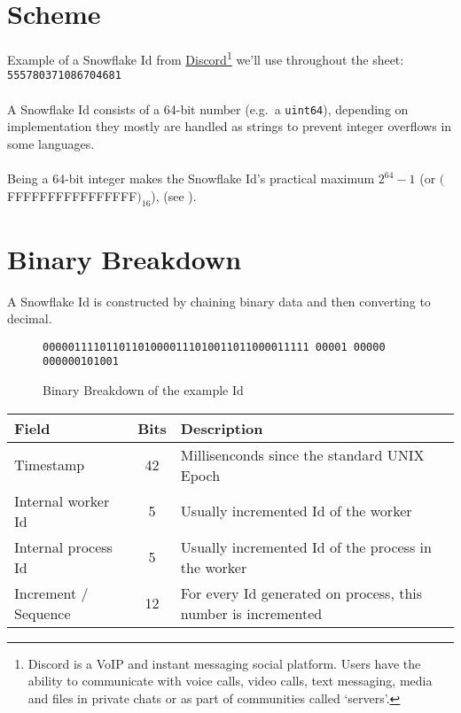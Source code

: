 \documentclass{article}
\newcommand{\code}[1]{\colorbox{cverbbg}{\texttt{#1}}}
\newcommand{\hn}[0]{\hfill \\}
\begin{document}
\section{Scheme}
Example of a Snowflake Id from
\href{https://discord.com/}{Discord}\footnote{Discord is a VoIP and instant
	messaging social platform. Users have the ability to communicate with
	voice
	calls, video calls, text messaging, media and files in private chats or
	as
	part
	of communities called `servers'.} we'll use throughout the sheet:
\code{555780371086704681} \\
\hn{}
A Snowflake Id consists of a 64-bit number (e.g.\ a \code{uint64}), depending
on
implementation they mostly are handled as strings to prevent integer overflows
in some languages. \\
\hn{}
Being a 64-bit integer makes the Snowflake Id's practical maximum
$2^{64} - 1$ (or $($FFFFFFFFFFFFFFFF$)_{16}$),
(see ).

\section{Binary Breakdown}
A Snowflake Id is constructed by chaining binary data and then converting to
decimal. \\

\begin{figure}[H]
	\large{\texttt{\color{cyan}000001111011011010000111010011011000011111
			\color{red}00001 \color{green}00000
			\color{gray}000000101001}}
	\\
	\caption{Binary Breakdown of the example
		Id}\label{fig:breakdown_example}
\end{figure}

\begin{table}[h]
	\begin{tabular}{l|c|l}
		Field                & Bits           & Description
		\\ \hline
		Timestamp            & \color{cyan}42 & Millisenconds since the
		standard UNIX Epoch
		\\ \hline
		Internal worker Id   & \color{red}5   & Usually incremented Id
		of the
		worker
		\\ \hline
		Internal process Id  & \color{green}5 & Usually incremented Id
		of the
		process in
		the worker
		\\ \hline
		Increment / Sequence & \color{gray}12 & For every Id generated
		on
		process, this number is incremented
	\end{tabular}
\end{table}
\end{document}
